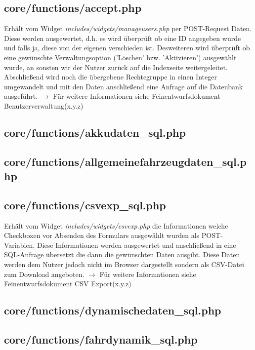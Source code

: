 \documentclass[fontsize = 12pt, paper = a4]{scrreprt}
\begin{document}
\subsection{core/functions/accept.php}
Erhält vom Widget \textit{includes/widgets/manageusers.php} per POST-Request Daten. Diese werden ausgewertet, d.h. es wird überprüft ob eine ID angegeben wurde und falls ja, diese von der eigenen verschieden ist. Desweiteren wird überprüft ob eine gewünschte Verwaltungsoption ('Löschen' bzw. 'Aktivieren') ausgewählt wurde, an sonsten wir der Nutzer zurück auf die Indexseite weitergeleitet. Abschließend wird noch die übergebene Rechtegruppe in einen Integer umgewandelt und mit den Daten anschließend eine Anfrage auf die Datenbank ausgeführt.
$\rightarrow$ Für weitere Informationen siehe Feinentwurfsdokument \glqq Benutzerverwaltung\grqq (x.y.z)

\subsection{core/functions/akkudaten\_sql.php}

\subsection{core/functions/allgemeinefahrzeugdaten\_sql.php}

\subsection{core/functions/csvexp\_sql.php}
Erhält vom Widget \textit{includes/widgets/csvexp.php} die Informationen welche Checkboxen vor Absenden des Formulars ausgewählt wurden als POST-Variablen. Diese Informationen werden ausgewertet und anschließend in eine SQL-Anfrage übersetzt die dann die gewünschten Daten ausgibt. Diese Daten werden dem Nutzer jedoch nicht im Browser dargestellt sondern als CSV-Datei zum Download angeboten.
$\rightarrow$ Für weitere Informationen siehe Feinentwurfsdokument \glqq CSV Export\grqq (x.y.z)

\subsection{core/functions/dynamischedaten\_sql.php}

\subsection{core/functions/fahrdynamik\_sql.php}
\end{document}
